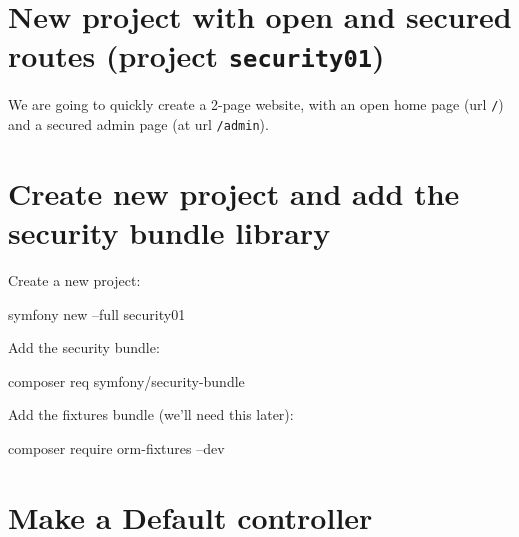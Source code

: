\documentclass[a4paperpaper,openright]{book}
\newenvironment{Shaded}{}{}
\newcommand{\ExtensionTok}[1]{#1}
\newcommand{\NormalTok}[1]{#1}
\begin{document}
\hypertarget{new-project-with-open-and-secured-routes-project-security01}{%
\section{\texorpdfstring{New project with open and secured routes
(project
\texttt{security01})}{New project with open and secured routes (project security01)}}\label{new-project-with-open-and-secured-routes-project-security01}}

We are going to quickly create a 2-page website, with an open home page
(url \texttt{/}) and a secured admin page (at url \texttt{/admin}).

\hypertarget{create-new-project-and-add-the-security-bundle-library}{%
\section{Create new project and add the security bundle
library}\label{create-new-project-and-add-the-security-bundle-library}}

Create a new project:

\begin{Shaded}
\begin{Highlighting}[]
    \ExtensionTok{symfony}\NormalTok{ new --full security01}
\end{Highlighting}
\end{Shaded}

Add the security bundle:

\begin{Shaded}
\begin{Highlighting}[]
    \ExtensionTok{composer}\NormalTok{ req symfony/security-bundle}
\end{Highlighting}
\end{Shaded}

Add the fixtures bundle (we'll need this later):

\begin{Shaded}
\begin{Highlighting}[]
    \ExtensionTok{composer}\NormalTok{ require orm-fixtures --dev }
\end{Highlighting}
\end{Shaded}

\hypertarget{make-a-default-controller}{%
\section{Make a Default controller}\label{make-a-default-controller}}
\end{document}
